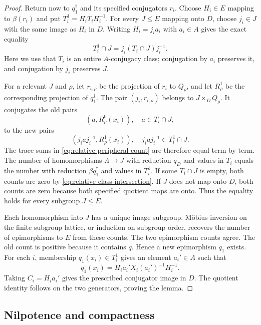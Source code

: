 \begin{proof}
Return now to $q_1^\dagger$ and its specified conjugators $r_i$.
Choose $H_i\in E$ mapping to $\beta(r_i)$ and put
$T_i^1=H_iT_iH_i^{-1}$. For every $J\leq E$ mapping onto $D$,
choose $j_i\in J$ with the same image as $H_i$ in $D$.
Writing $H_i=j_ia_i$ with $a_i\in A$ gives the exact equality
\begin{equation}
 T_i^1\cap J=j_i(T_i\cap J)j_i^{-1}.
 \label{eq:relative-class-intersection}
\end{equation}
Here we use that $T_i$ is an entire $A$-conjugacy class; conjugation
by $a_i$ preserves it, and conjugation by $j_i$ preserves $J$.

For a relevant $J$ and $\rho$, let $r_{i,\rho}$ be the projection
of $r_i$ to $Q_\rho$, and let $R_\rho^1$ be the corresponding
projection of $q_1^\dagger$. The pair $(j_i,r_{i,\rho})$ belongs
to $J\times_DQ_\rho$. It conjugates the old pairs
\[
 (a,R_\rho^0(x_i)),\quad a\in T_i\cap J,
\]
to the new pairs
\[
 (j_iaj_i^{-1},R_\rho^1(x_i)),\quad
       j_iaj_i^{-1}\in T_i^1\cap J.
\]
The trace sums in \eqref{eq:relative-peripheral-count} are therefore
equal term by term. The number of homomorphisms $\Lambda\to J$
with reduction $q_D$ and values in $T_i$ equals the number with
reduction $\beta q_1^\dagger$ and values in $T_i^1$.
If some $T_i\cap J$ is empty, both counts are zero by
\eqref{eq:relative-class-intersection}. If $J$ does not map onto $D$,
both counts are zero because both specified quotient maps are onto.
Thus the equality holds for every subgroup $J\leq E$.

Each homomorphism into $J$ has a unique image subgroup. M\"obius
inversion on the finite subgroup lattice, or induction on subgroup
order, recovers the number of epimorphisms to $E$ from these counts.
The two epimorphism counts agree. The old count is positive because
it contains $q$. Hence a new epimorphism $q_1$ exists. For each $i$,
membership $q_1(x_i)\in T_i^1$ gives an element $a_i'\in A$ such
that
\[
 q_1(x_i)=H_ia_i'X_i(a_i')^{-1}H_i^{-1}.
\]
Taking $C_i=H_ia_i'$ gives the prescribed conjugator image in $D$.
The quotient identity follows on the two generators, proving the lemma.
\end{proof}

\subsection{Nilpotence and compactness}

